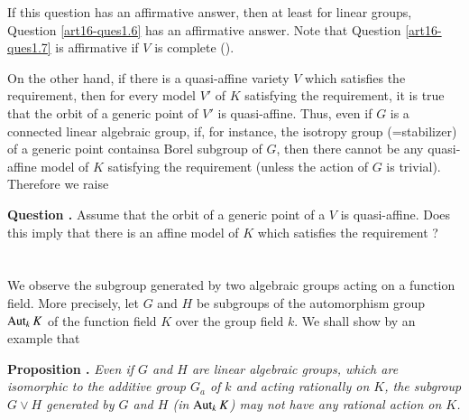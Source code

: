 If this question has an affirmative answer, then at least for linear groups, Question \ref{art16-ques1.6} has an affirmative answer. Note that Question \ref{art16-ques1.7} is affirmative if $V$ is complete (\cite{art16-key-K}).

On the other hand, if there is a quasi-affine variety $V$ which satisfies the requirement, then for every model $V'$ of $K$ satisfying the requirement, it is true that the orbit of a generic point of $V'$ is quasi-affine. Thus, even if $G$ is a connected linear algebraic group, if, for instance, the isotropy group (=stabilizer) of a generic point contains\pageoriginale a Borel subgroup of $G$, then there cannot be any quasi-affine model of $K$ satisfying the requirement (unless the action of $G$ is trivial). Therefore we raise

\medskip
\noindent
{\bf Question .\label{art16-ques1.8}}
Assume that the orbit of a generic point of a $V$ is quasi-affine. Does this imply that there is an affine model of $K$ which satisfies the requirement ?

\section{}\label{art16-sec2}
We observe the subgroup generated by two algebraic groups acting on a function field. More precisely, let $G$ and $H$ be subgroups of the automorphism group $\operatorname{\mathrm{Aut}}_{k}K$ of the function field $K$ over the group field $k$. We shall show by an example that

\medskip
\noindent
{\bf Proposition .\label{art16-prop2.1}}
{\em Even if $G$ and $H$ are linear algebraic groups, which are isomorphic to the additive group $G_{a}$ of $k$ and acting rationally on $K$, the subgroup $G\vee H$ generated by $G$ and $H$ (in $\operatorname{\mathrm{Aut}}_{k}K$) may not have any rational action on $K$.}
\smallskip

